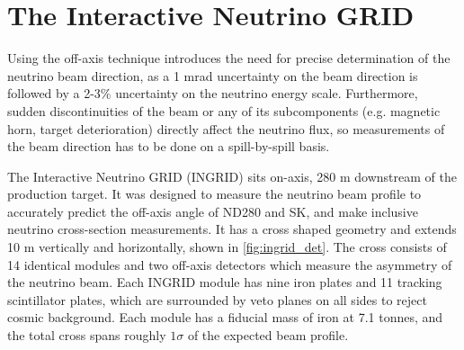 \section{The Interactive Neutrino GRID}
\label{sec:ingrid}
Using the off-axis technique introduces the need for precise determination of the neutrino beam direction, as a 1 mrad uncertainty on the beam direction is followed by a 2-3\% uncertainty on the neutrino energy scale. Furthermore, sudden discontinuities of the beam or any of its subcomponents (e.g. magnetic horn, target deterioration) directly affect the neutrino flux, so measurements of the beam direction has to be done on a spill-by-spill basis.

The Interactive Neutrino GRID (INGRID) sits on-axis, 280 m downstream of the production target. It was designed to measure the neutrino beam profile to accurately predict the off-axis angle of ND280 and SK, and make inclusive neutrino cross-section measurements\cite{t2k_ingrid_xsec}. It has a cross shaped geometry and extends 10 m vertically and horizontally, shown in \autoref{fig:ingrid_det}. The cross consists of 14 identical modules and two off-axis detectors which measure the asymmetry of the neutrino beam. Each INGRID module has nine iron plates and 11 tracking scintillator plates, which are surrounded by veto planes on all sides to reject cosmic background\cite{t2k_ingrid}. Each module has a fiducial mass of iron at 7.1 tonnes, and the total cross spans roughly $1\sigma$ of the expected beam profile.
